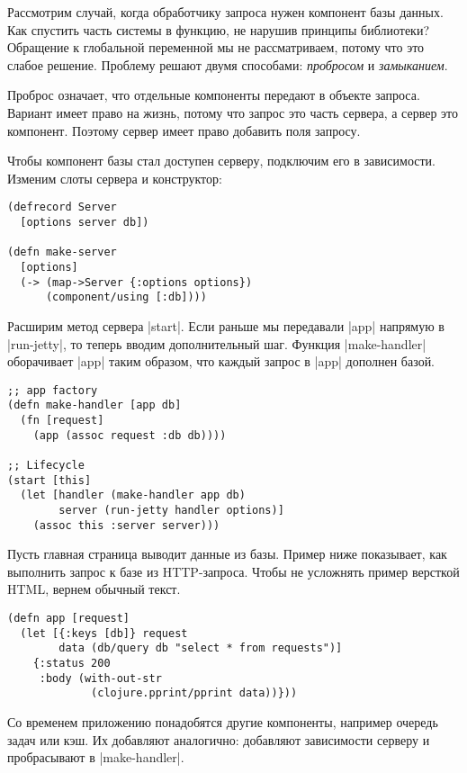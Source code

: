 Рассмотрим случай, когда обработчику запроса нужен компонент базы данных. Как
спустить часть системы в функцию, не нарушив принципы библиотеки? Обращение к
глобальной переменной мы не рассматриваем, потому что это слабое
решение. Проблему решают двумя способами: \emph{пробросом} и \emph{замыканием}.

Проброс означает, что отдельные компоненты передают в объекте запроса. Вариант
имеет право на жизнь, потому что запрос это часть сервера, а сервер это
компонент. Поэтому сервер имеет право добавить поля запросу.

Чтобы компонент базы стал доступен серверу, подключим его в зависимости. Изменим
слоты сервера и конструктор:

\begin{verbatim}
(defrecord Server
  [options server db])

(defn make-server
  [options]
  (-> (map->Server {:options options})
      (component/using [:db])))
\end{verbatim}

Расширим метод сервера \spverb|start|. Если раньше мы передавали \spverb|app|
напрямую в \spverb|run-jetty|, то теперь вводим дополнительный шаг. Функция
\spverb|make-handler| оборачивает \spverb|app| таким образом, что каждый запрос
в \spverb|app| дополнен базой.

\begin{verbatim}
;; app factory
(defn make-handler [app db]
  (fn [request]
    (app (assoc request :db db))))

;; Lifecycle
(start [this]
  (let [handler (make-handler app db)
        server (run-jetty handler options)]
    (assoc this :server server)))
\end{verbatim}

Пусть главная страница выводит данные из базы. Пример ниже показывает, как
выполнить запрос к базе из HTTP-запроса. Чтобы не усложнять пример версткой
HTML, вернем обычный текст.

\begin{verbatim}
(defn app [request]
  (let [{:keys [db]} request
        data (db/query db "select * from requests")]
    {:status 200
     :body (with-out-str
             (clojure.pprint/pprint data))}))
\end{verbatim}

Со временем приложению понадобятся другие компоненты, например очередь задач или
кэш. Их добавляют аналогично: добавляют зависимости серверу и пробрасывают в
\spverb|make-handler|.

